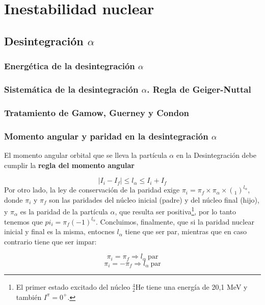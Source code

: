 \chapter{Inestabilidad nuclear}

\section{Desintegración $\alpha$}

\subsection{Energética de la desintegración $\alpha$}

\subsection{Sistemática de la desintegración $\alpha$. Regla de Geiger-Nuttal}

\subsection{Tratamiento de Gamow, Guerney y Condon}

\subsection{Momento angular y paridad en la desintegración $\alpha$}


El momento angular orbital que se lleva la partícula $\alpha$ en la Desintegración debe cumplir la \textbf{regla del momento angular}

\begin{equation}
    |I_i-I_f|\leq l_\alpha \leq I_i + I_f
\end{equation}
Por otro lado, la ley de conservación de la paridad exige $\pi_i=\pi_f \times \pi_\alpha \times (_1)^{l_\alpha}$, donde $\pi_i$ y $\pi_f$ son las paridades del núcleo inicial (padre) y del núcleo final (hijo), y $\pi_\alpha$ es la paridad de la partícula $\alpha$, que resulta ser positiva\footnote{El primer estado excitado del núcleo $^4_2$He tiene una energía de 20,1 MeV y también $I^\pi = 0^+$.}, por lo tanto tenemos que $pi_i = \pi_f (-1)^{l_\alpha}$. Concluimos, finalmente, que si la paridad nuclear inicial y final es la misma, entocnes $l_\alpha$ tiene que ser par, mientras que en caso contrario tiene que ser impar:

\begin{equation}
    \pi_i = \pi_f \Longrightarrow l_\alpha \ \text{par}
\end{equation}
\begin{equation*}
    \pi_i = - \pi_f \Longrightarrow l_\alpha \ \text{par}
\end{equation*}


